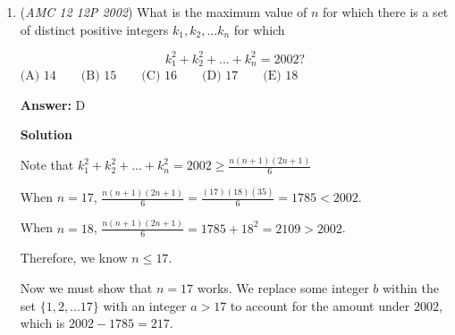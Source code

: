 \begin{enumerate}
 \textbf{Answer: }C



\textbf{Solution 1}

Since this is a number theory question, it is clear that the main challenge here is factoring the given cubic. In general, the rational root theorem will be very useful for these situations. 

 The rational root theorem states that all rational roots of $n^3 - 8n^2 + 20n - 13$ will be among $1, 13, -1$, and $-13$. Evaluating the cubic at these values will give $n = 1$ as a root. Doing some synthetic division gives 
 \[n^3 - 8n^2 + 20n - 13 = (n-1)(n^2 - 7n + 13)\]

 Since $n > 0$, $n-1$ must be positive. Since $(n-1)(n^2 - 7n + 13)$ evaluates to a prime, it is clear that exactly one of $n-1$ and $n^2 - 7n - 13$ is $1$. We proceed by splitting the problem into 2 cases.

 Case 1: $n-1 = 1$It is clear that $n = 2$.  We have $2^2 - 7(2) + 13 = 3$, so this case yields $n = 2$ as a solution.

 Case 2: $n^2 - 7n + 13 = 1$Solving for $n$ gives $n^2 - 7n + 12 = 0$ or $(n-3)(n-4) = 0$. Therefore, $n = 3$ or $n = 4$.Since both $3-1 = 2$ and $4-1 = 3$ are prime, both $n = 3$ and $n = 4$ work, yielding 2 solutions.

 Putting everything together, the answer is $1 + 2 = \boxed{\textbf{(C) }3}$.

 


	\item (\textit{AMC 12 12P 2002}) What is the maximum value of $n$ for which there is a set of distinct positive integers $k_1, k_2, ... k_n$ for which


 
 \[k^2_1 + k^2_2 + ... + k^2_n = 2002?\]
$\text{(A) }14 \qquad \text{(B) }15 \qquad \text{(C) }16 \qquad \text{(D) }17 \qquad \text{(E) }18$

 \textbf{Answer: }D



\textbf{Solution}

Note that $k^2_1 + k^2_2 + ... + k^2_n = 2002 \geq \frac{n(n+1)(2n+1)}{6}$

 When $n = 17$, $\frac{n(n+1)(2n+1)}{6} = \frac{(17)(18)(35)}{6} = 1785 < 2002$.

 When $n = 18$, $\frac{n(n+1)(2n+1)}{6} = 1785 + 18^2 = 2109 > 2002$.

 Therefore, we know $n \leq 17$.

 Now we must show that $n = 17$ works. We replace some integer $b$ within the set $\{1, 2, ... 17\}$ with an integer $a > 17$ to account for the amount under $2002$, which is $2002-1785 = 217$.


\end{enumerate}
